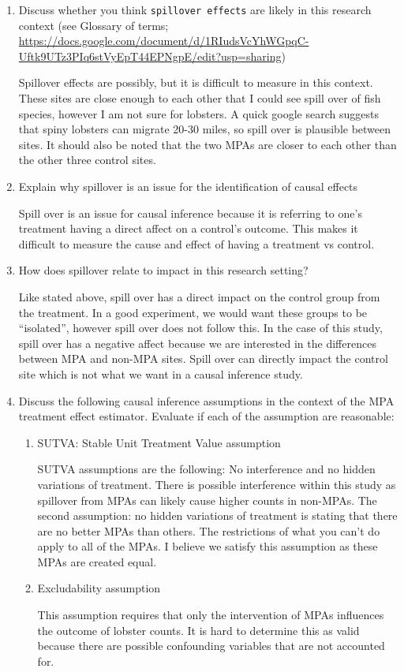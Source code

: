 \documentclass[
]{article}
\begin{document}
\begin{enumerate}
\def\labelenumi{\alph{enumi}.}
\item
  Discuss whether you think \texttt{spillover\ effects} are likely in
  this research context (see Glossary of terms;
  \url{https://docs.google.com/document/d/1RIudsVcYhWGpqC-Uftk9UTz3PIq6stVyEpT44EPNgpE/edit?usp=sharing})

  Spillover effects are possibly, but it is difficult to measure in this
  context. These sites are close enough to each other that I could see
  spill over of fish species, however I am not sure for lobsters. A
  quick google search suggests that spiny lobsters can migrate 20-30
  miles, so spill over is plausible between sites. It should also be
  noted that the two MPAs are closer to each other than the other three
  control sites.
\item
  Explain why spillover is an issue for the identification of causal
  effects

  Spill over is an issue for causal inference because it is referring to
  one's treatment having a direct affect on a control's outcome. This
  makes it difficult to measure the cause and effect of having a
  treatment vs control.
\item
  How does spillover relate to impact in this research setting?

  Like stated above, spill over has a direct impact on the control group
  from the treatment. In a good experiment, we would want these groups
  to be ``isolated'', however spill over does not follow this. In the
  case of this study, spill over has a negative affect because we are
  interested in the differences between MPA and non-MPA sites. Spill
  over can directly impact the control site which is not what we want in
  a causal inference study.
\item
  Discuss the following causal inference assumptions in the context of
  the MPA treatment effect estimator. Evaluate if each of the assumption
  are reasonable:

  \begin{enumerate}
  \def\labelenumii{\arabic{enumii})}
  \item
    SUTVA: Stable Unit Treatment Value assumption

    SUTVA assumptions are the following: No interference and no hidden
    variations of treatment. There is possible interference within this
    study as spillover from MPAs can likely cause higher counts in
    non-MPAs. The second assumption: no hidden variations of treatment
    is stating that there are no better MPAs than others. The
    restrictions of what you can't do apply to all of the MPAs. I
    believe we satisfy this assumption as these MPAs are created equal.
  \item
    Excludability assumption

    This assumption requires that only the intervention of MPAs
    influences the outcome of lobster counts. It is hard to determine
    this as valid because there are possible confounding variables that
    are not accounted for.
  \end{enumerate}
\end{enumerate}
\end{document}
